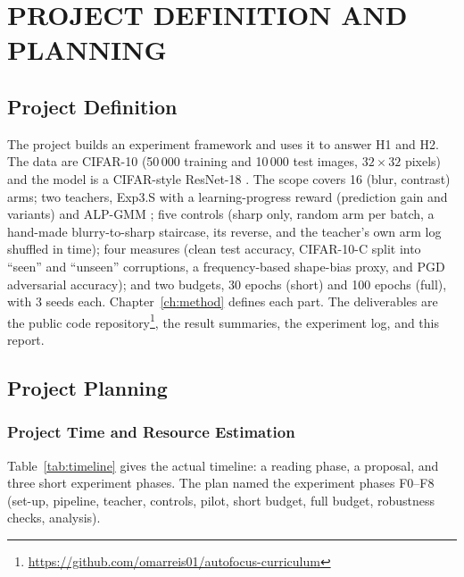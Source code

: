 \documentclass[a4paper,12pt]{report}
\begin{document}
\chapter{PROJECT DEFINITION AND PLANNING}

\section{Project Definition}

The project builds an experiment framework and uses it to answer H1 and H2. The data are CIFAR-10 (50\,000 training and 10\,000 test images, $32\times32$ pixels) and the model is a CIFAR-style ResNet-18 \cite{he2016resnet}. The scope covers 16 (blur, contrast) arms; two teachers, Exp3.S \cite{graves2017,auer2002} with a learning-progress reward (prediction gain and variants) and ALP-GMM \cite{portelas2019}; five controls (sharp only, random arm per batch, a hand-made blurry-to-sharp staircase, its reverse, and the teacher's own arm log shuffled in time); four measures (clean test accuracy, CIFAR-10-C split into ``seen'' and ``unseen'' corruptions, a frequency-based shape-bias proxy, and PGD adversarial accuracy); and two budgets, 30 epochs (short) and 100 epochs (full), with 3 seeds each. Chapter~\ref{ch:method} defines each part. The deliverables are the public code repository\footnote{\url{https://github.com/omarreis01/autofocus-curriculum}}, the result summaries, the experiment log, and this report.

\section{Project Planning}

\subsection{Project Time and Resource Estimation}

Table~\ref{tab:timeline} gives the actual timeline: a reading phase, a proposal, and three short experiment phases. The plan named the experiment phases F0--F8 (set-up, pipeline, teacher, controls, pilot, short budget, full budget, robustness checks, analysis).
\end{document}

